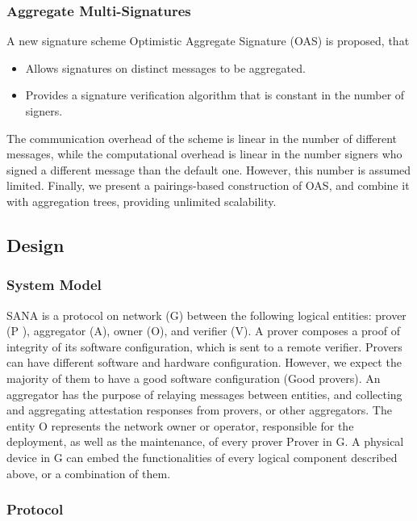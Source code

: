 \documentclass{article}
\begin{document}
\subsubsection{Aggregate Multi-Signatures}

A new signature scheme Optimistic Aggregate Signature (OAS) is proposed, that \begin{itemize}
\item Allows signatures on distinct messages to be aggregated.
\item Provides a signature verification algorithm that is constant in the number of signers.
\end{itemize} 
The communication overhead of the scheme is linear in the number of different messages, while the computational overhead is linear in the number signers who signed a different message than the default one. However, this number is assumed limited. Finally, we present a pairings-based construction of OAS, and combine it with aggregation trees, providing unlimited scalability.

\subsection{Design}

\subsubsection{System Model}

SANA is a protocol on network (G) between the following logical entities: prover (P ), aggregator (A), owner (O), and verifier (V). A prover composes a proof of integrity of its software configuration, which is sent to a remote verifier. Provers can have different software and hardware configuration. However, we expect the majority of them to have a good software configuration (Good provers). An aggregator has the purpose of relaying messages between entities, and collecting and aggregating attestation responses from provers, or other aggregators. The entity O represents the network owner or operator, responsible for the deployment, as well as the maintenance, of every prover Prover in G. A physical device in G can embed the functionalities of every logical component described above, or a combination of them.

\subsubsection{Protocol}
\end{document}
